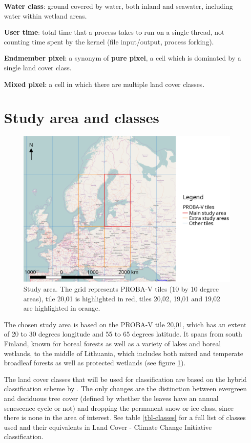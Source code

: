 \documentclass[a4paper,10pt]{book}
\begin{document}
\textbf{Water class}: ground covered by water, both inland and seawater, including water within wetland areas.

\textbf{User time}: total time that a process takes to run on a single thread, not counting time spent by the kernel (file input/output, process forking).

\textbf{Endmember pixel}: a synonym of \textbf{pure pixel}, a cell which is dominated by a single land cover class.

\textbf{Mixed pixel}: a cell in which there are multiple land cover classes.

\section{Study area and classes}

\begin{figure}
 \includegraphics[width=\textwidth]{./proposal-figures/studyarea.png}
 \caption{Study area. The grid represents PROBA-V tiles (10 by 10 degree areas), tile 20,01 is highlighted in red, tiles 20,02, 19,01 and 19,02 are highlighted in orange.}
 \label{AOI}
\end{figure} 

The chosen study area is based on the PROBA-V tile 20,01, which has an extent of 20 to 30 degrees longitude and 55 to 65 degrees latitude. It spans from south Finland, known for boreal forests as well as a variety of lakes and boreal wetlands, to the middle of Lithuania, which includes both mixed and temperate broadleaf forests as well as protected wetlands (see figure \ref{AOI}).

The land cover classes that will be used for classification are based on the hybrid classification scheme by \citep{see2015hybrid}. The only changes are the distinction between evergreen and deciduous tree cover (defined by whether the leaves have an annual senescence cycle or not) and dropping the permanent snow or ice class, since there is none in the area of interest. See table \ref{tbl-classes} for a full list of classes used and their equivalents in Land Cover - Climate Change Initiative classification.
\end{document}
